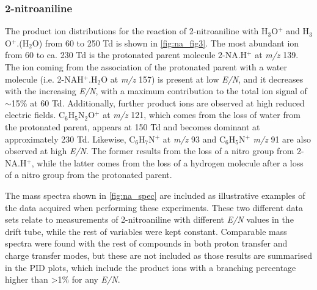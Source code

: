 \subsubsection{2-nitroaniline}
The product ion distributions for the reaction of 2-nitroaniline with H$_3$O$^+$ and H$_3$O$^+$.(H$_2$O) from 60 to 250 Td is shown in \autoref{fig:na_fig3}. 
The most abundant ion from 60 to ca. 230 Td is the protonated parent molecule 2-NA.H$^+$ at \textit{m/z} 139. %
The ion coming from the association of the protonated parent with a water molecule (i.e. 2-NAH$^+$.H$_2$O at \textit{m/z} 157) is present at low \textit{E/N}, and it decreases with the increasing \textit{E/N}, with a maximum contribution to the total ion signal of $\sim$15\% at 60 Td.
Additionally, further product ions are observed at high reduced electric fields. 
C$_6$H$_5$N$_2$O$^+$ at \textit{m/z} 121, which comes from the loss of water from the protonated parent, appears at 150 Td and becomes dominant at approximately 230 Td.
Likewise, C$_6$H$_7$N$^+$ at \textit{m/z} 93 and C$_6$H$_5$N$^+$ \textit{m/z} 91 are also observed at high \textit{E/N}. 
The former results from the loss of a nitro group from 2-NA.H$^+$, while the latter comes from the loss of a hydrogen molecule after a loss of a nitro group from the protonated parent.

The mass spectra shown in \autoref{fig:na_spec} are included as illustrative examples of the data acquired when performing these experiments. 
These two different data sets relate to measurements of 2-nitroaniline with different \textit{E/N} values in the drift tube, while the rest of variables were kept constant. 
Comparable mass spectra were found with the rest of compounds in both proton transfer and charge transfer modes, but these are not included as those results are summarised in the PID plots, which include the product ions with a branching percentage higher than >1\% for any \textit{E/N}.


